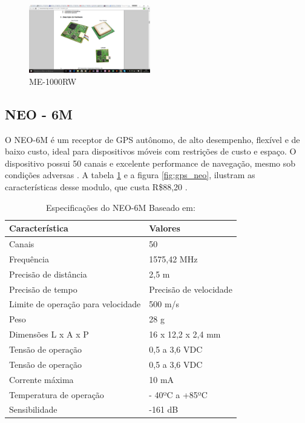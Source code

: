 \begin{figure}[h]
  \centering
  \includegraphics[width=200px, scale=1]{figuras/gps_me1000}
  \caption{ME-1000RW \cite{11gps}}
\label{fig:gps_me1000}
\end{figure}

\subsection{NEO - 6M}

O NEO-6M é um receptor de GPS autônomo, de alto desempenho, flexível e de
baixo custo, ideal para dispositivos móveis com restrições de custo e
 espaço. O dispositivo possui 50 canais e excelente performance de navegação,
 mesmo sob condições adversas \cite{13gps}. A tabela \ref{table:especificacao_gps_neo}
  e a figura \ref{fig:gps_neo}, ilustram as
 características desse modulo, que custa R\$88,20 \cite{14gps}.


 \begin{table}[ht]
 \caption{Especificações do NEO-6M Baseado em: \cite{13gps}}
 \centering
 \begin{tabular}{| l |  p{5cm} |}
 \hline
 Característica & Valores \\
 \hline
 Canais & 50 \\
 \hline
 Frequência & 1575,42 MHz \\
 \hline
 Precisão de distância & 2,5 m \\
 \hline
 Precisão de tempo & Precisão de velocidade \\
 \hline
 Limite de operação para velocidade & 500 m/s \\
 \hline
 Peso & 28 g \\
 \hline
 Dimensões L x A x P & 16 x 12,2 x 2,4 mm \\
 \hline
 Tensão de operação & 0,5 a 3,6 VDC \\
 \hline
 Tensão de operação & 0,5 a 3,6 VDC \\
 \hline
 Corrente máxima & 10 mA \\
 \hline
 Temperatura de operação & - 40ºC a +85ºC \\
 \hline
 Sensibilidade & -161 dB \\
 \hline
 \end{tabular}
 \label{table:especificacao_gps_neo}
 \end{table}

